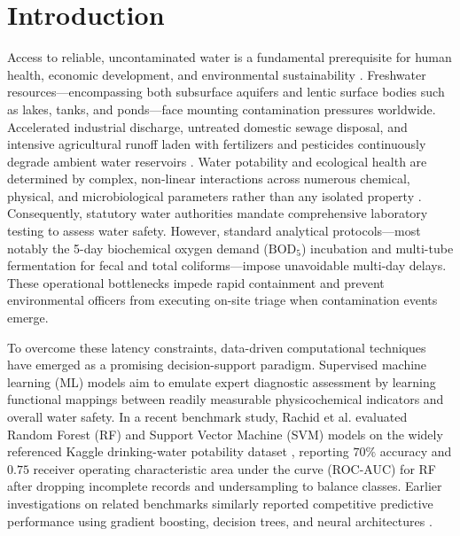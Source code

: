 \documentclass[pdflatex,sn-mathphys-num]{sn-jnl}%
\theoremstyle{thmstyleone}%
\theoremstyle{thmstyletwo}%
\theoremstyle{thmstylethree}%
\begin{document}
\section{Introduction}\label{sec1}

Access to reliable, uncontaminated water is a fundamental prerequisite for human health, economic development, and environmental sustainability \cite{unesco2023}. Freshwater resources---encompassing both subsurface aquifers and lentic surface bodies such as lakes, tanks, and ponds---face mounting contamination pressures worldwide. Accelerated industrial discharge, untreated domestic sewage disposal, and intensive agricultural runoff laden with fertilizers and pesticides continuously degrade ambient water reservoirs \cite{akhtar2021,peters2000,rashmi2020}. Water potability and ecological health are determined by complex, non-linear interactions across numerous chemical, physical, and microbiological parameters rather than any isolated property \cite{mccutcheon1992,who2017}. Consequently, statutory water authorities mandate comprehensive laboratory testing to assess water safety. However, standard analytical protocols---most notably the 5-day biochemical oxygen demand ($\text{BOD}_5$) incubation and multi-tube fermentation for fecal and total coliforms---impose unavoidable multi-day delays. These operational bottlenecks impede rapid containment and prevent environmental officers from executing on-site triage when contamination events emerge.

To overcome these latency constraints, data-driven computational techniques have emerged as a promising decision-support paradigm. Supervised machine learning (ML) models aim to emulate expert diagnostic assessment by learning functional mappings between readily measurable physicochemical indicators and overall water safety. In a recent benchmark study, Rachid et al. \cite{rachid2025} evaluated Random Forest (RF) and Support Vector Machine (SVM) models on the widely referenced Kaggle drinking-water potability dataset \cite{kadiwal2020}, reporting $70\%$ accuracy and $0.75$ receiver operating characteristic area under the curve (ROC-AUC) for RF after dropping incomplete records and undersampling to balance classes. Earlier investigations on related benchmarks similarly reported competitive predictive performance using gradient boosting, decision trees, and neural architectures \cite{ghosh2023,kaddoura2022,ahmed2019,bui2020,aldhyani2020}.
\end{document}
